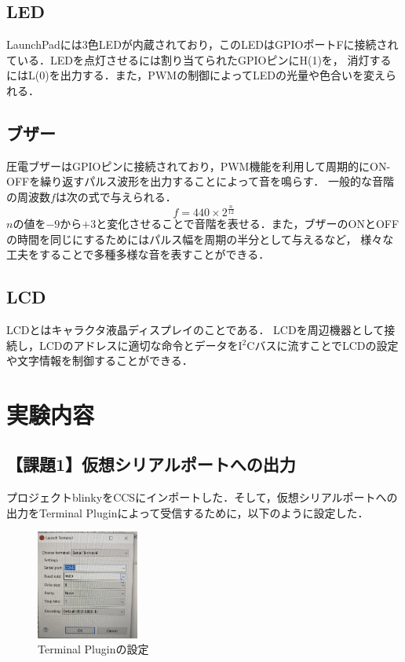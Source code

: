\documentclass{jlreq}
\begin{document}
\subsection{LED}
LaunchPadには3色LEDが内蔵されており，このLEDはGPIOポートFに接続されている．LEDを点灯させるには割り当てられたGPIOピンにH(1)を，
消灯するにはL(0)を出力する．また，PWMの制御によってLEDの光量や色合いを変えられる．

\subsection{ブザー}
圧電ブザーはGPIOピンに接続されており，PWM機能を利用して周期的にON-OFFを繰り返すパルス波形を出力することによって音を鳴らす．
一般的な音階の周波数$f$は次の式で与えられる．
\begin{equation}
    f=440\times2^{\frac{n}{12}}
\end{equation}
$n$の値を$-9$から$+3$と変化させることで音階を表せる．また，ブザーのONとOFFの時間を同じにするためにはパルス幅を周期の半分として与えるなど，
様々な工夫をすることで多種多様な音を表すことができる．

\subsection{LCD}
LCDとはキャラクタ液晶ディスプレイのことである．
LCDを周辺機器として接続し，LCDのアドレスに適切な命令とデータをI$^2$Cバスに流すことでLCDの設定や文字情報を制御することができる．

\section{実験内容}

\subsection{【課題1】仮想シリアルポートへの出力}
プロジェクトblinkyをCCSにインポートした．そして，仮想シリアルポートへの出力をTerminal Pluginによって受信するために，以下のように設定した．
\begin{figure}
    \centering
    \includegraphics[width=0.3\textwidth]{mysetting.jpg}
    \caption{Terminal Pluginの設定}
    \label{fig:Terminal_Plugin}
\end{figure}
\end{document}
